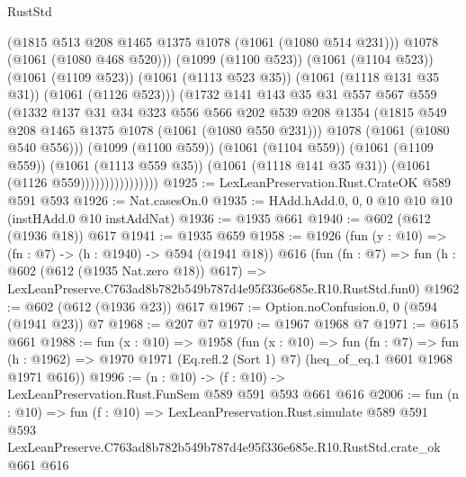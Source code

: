 \begin{lexlean}{RustStd}
\begin{coremodule}
                                  (@1815 @513 @208 @1465 @1375 @1078 (@1061 (@1080 @514 @231)))
                                  @1078
                                  (@1061 (@1080 @468 @520)))
                                (@1099 (@1100 @523))
                                (@1061 (@1104 @523))
                                (@1061 (@1109 @523))
                                (@1061 (@1113 @523 @35))
                                (@1061 (@1118 @131 @35 @31))
                                (@1061 (@1126 @523)))
                              (@1732
                                @141
                                @143
                                @35
                                @31
                                @557
                                @567
                                @559
                                (@1332
                                  @137
                                  @31
                                  @34
                                  @323
                                  @556
                                  @566
                                  @202
                                  @539
                                  @208
                                  @1354
                                  (@1815 @549 @208 @1465 @1375 @1078 (@1061 (@1080 @550 @231)))
                                  @1078
                                  (@1061 (@1080 @540 @556)))
                                (@1099 (@1100 @559))
                                (@1061 (@1104 @559))
                                (@1061 (@1109 @559))
                                (@1061 (@1113 @559 @35))
                                (@1061 (@1118 @141 @35 @31))
                                (@1061 (@1126 @559))))))))))))))))
@1925 := LexLeanPreservation.Rust.CrateOK @589 @591 @593
@1926 := Nat.casesOn.{0}
@1935 := HAdd.hAdd.{0, 0, 0} @10 @10 @10 (instHAdd.{0} @10 instAddNat)
@1936 := @1935 @661
@1940 := @602 (@612 (@1936 @18)) @617
@1941 := @1935 @659
@1958 := @1926
    (fun (y : @10) => (fn : @7) -> (h : @1940) -> @594 (@1941 @18))
    @616
    (fun (fn : @7) =>
    fun (h : @602 (@612 (@1935 Nat.zero @18)) @617) =>
    LexLeanPreserve.C763ad8b782b549b787d4e95f336e685e.R10.RustStd.fun0)
@1962 := @602 (@612 (@1936 @23)) @617
@1967 := Option.noConfusion.{0, 0} (@594 (@1941 @23)) @7
@1968 := @207 @7
@1970 := @1967 @1968 @7
@1971 := @615 @661
@1988 := fun (x : @10) =>
  @1958
    (fun (x : @10) =>
    fun (fn : @7) =>
    fun (h : @1962) => @1970 @1971 (Eq.refl.{2} (Sort 1) @7) (heq_of_eq.{1} @601 @1968 @1971 @616))
@1996 := (n : @10) -> (f : @10) -> LexLeanPreservation.Rust.FunSem @589 @591 @593 @661 @616
@2006 := fun (n : @10) =>
  fun (f : @10) =>
  LexLeanPreservation.Rust.simulate
    @589
    @591
    @593
    LexLeanPreserve.C763ad8b782b549b787d4e95f336e685e.R10.RustStd.crate_ok
    @661
    @616
\end{coremodule}
\end{lexlean}
